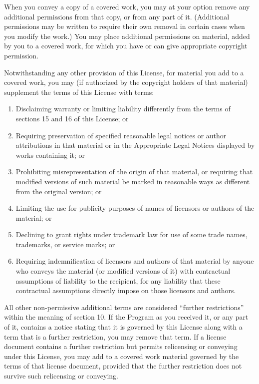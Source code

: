 \documentclass[10pt,a4paper,ngerman,titlepage,tocindentauto]{article}
\begin{document}
\begin{multicols}{3}
{\begin{enumerate}
					When you convey a copy of a covered work, you may at your option
					remove any additional permissions from that copy, or from any part of
					it.  (Additional permissions may be written to require their own
					removal in certain cases when you modify the work.)  You may place
					additional permissions on material, added by you to a covered work,
					for which you have or can give appropriate copyright permission.

					Notwithstanding any other provision of this License, for material you
					add to a covered work, you may (if authorized by the copyright holders of
					that material) supplement the terms of this License with terms:
					  \begin{enumerate}
					  \item Disclaiming warranty or limiting liability differently from the
					  terms of sections 15 and 16 of this License; or

					  \item Requiring preservation of specified reasonable legal notices or
					  author attributions in that material or in the Appropriate Legal
					  Notices displayed by works containing it; or

					  \item Prohibiting misrepresentation of the origin of that material, or
					  requiring that modified versions of such material be marked in
					  reasonable ways as different from the original version; or

					  \item Limiting the use for publicity purposes of names of licensors or
					  authors of the material; or

					  \item Declining to grant rights under trademark law for use of some
					  trade names, trademarks, or service marks; or

					  \item Requiring indemnification of licensors and authors of that
					  material by anyone who conveys the material (or modified versions of
					  it) with contractual assumptions of liability to the recipient, for
					  any liability that these contractual assumptions directly impose on
					  those licensors and authors.
					  \end{enumerate}

					All other non-permissive additional terms are considered ``further
					restrictions'' within the meaning of section 10.  If the Program as you
					received it, or any part of it, contains a notice stating that it is
					governed by this License along with a term that is a further
					restriction, you may remove that term.  If a license document contains
					a further restriction but permits relicensing or conveying under this
					License, you may add to a covered work material governed by the terms
					of that license document, provided that the further restriction does
					not survive such relicensing or conveying.


\end{enumerate}}
\end{multicols}
\end{document}

